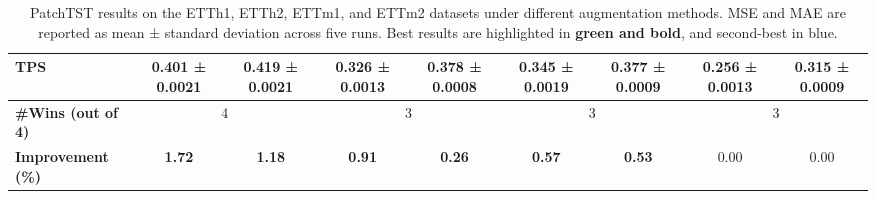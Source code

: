 \begin{table}[h!]
\begin{adjustbox}{max width=\textwidth}
\begin{tabular}{l|cc|cc|cc|cc}
    TPS   & \cellcolor{bestcolor}\textbf{0.401 ± 0.0021} & \cellcolor{bestcolor}\textbf{0.419 ± 0.0021} & \cellcolor{bestcolor}\textbf{0.326 ± 0.0013} & \cellcolor{bestcolor}\textbf{0.378 ± 0.0008} & \cellcolor{bestcolor}\textbf{0.345 ± 0.0019} & \cellcolor{bestcolor}\textbf{0.377 ± 0.0009} & \cellcolor{secondcolor}0.256 ± 0.0013 & \cellcolor{bestcolor}\textbf{0.315 ± 0.0009} \\
    \midrule
    \textbf{\#Wins (out of 4)} & \multicolumn{2}{c|}{4} & \multicolumn{2}{c|}{3} & \multicolumn{2}{c|}{3} & \multicolumn{2}{c}{3} \\
    \textbf{Improvement (\%)} & \cellcolor{bestcolor} \textbf{1.72} & \cellcolor{bestcolor} \textbf{1.18} & \cellcolor{bestcolor} \textbf{0.91} & \cellcolor{bestcolor} \textbf{0.26} & \cellcolor{bestcolor} \textbf{0.57} & \cellcolor{bestcolor} \textbf{0.53} & \cellcolor{baselinecolor}0.00 & \cellcolor{baselinecolor}0.00 \\
    \bottomrule
\end{tabular}
\end{adjustbox}
\caption{PatchTST results on the ETTh1, ETTh2, ETTm1, and ETTm2 datasets under different augmentation methods. MSE and MAE are reported as mean ± standard deviation across five runs. Best results are highlighted in \textbf{green and bold}, and second-best in blue.}
\label{tb: pts1}
\end{table}


